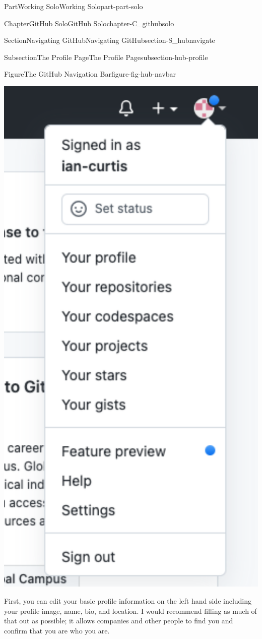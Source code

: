 \documentclass[twoside,10pt,]{book}
\begin{document}
\begin{partptx}{Part}{Working Solo}{}{Working Solo}{}{}{part-part-solo}
\begin{chapterptx}{Chapter}{GitHub Solo}{}{GitHub Solo}{}{}{chapter-C_githubsolo}
\begin{sectionptx}{Section}{Navigating GitHub}{}{Navigating GitHub}{}{}{section-S_hubnavigate}
\begin{subsectionptx}{Subsection}{The Profile Page}{}{The Profile Page}{}{}{subsection-hub-profile}
\begin{figureptx}{Figure}{The GitHub Navigation Bar}{figure-fig-hub-navbar}{}
\begin{image}{0.35}{0.3}{0.35}{}
\includegraphics[width=\linewidth]{external/hub_navbar.pdf}
\end{image}%
\tcblower
\end{figureptx}%
First, you can edit your basic profile information on the left hand side including your profile image, name, bio, and location. I would recommend filling as much of that out as possible; it allows companies and other people to find you and confirm that you are who you are.%

\end{subsectionptx}
\end{sectionptx}
\end{chapterptx}
\end{partptx}
\end{document}
